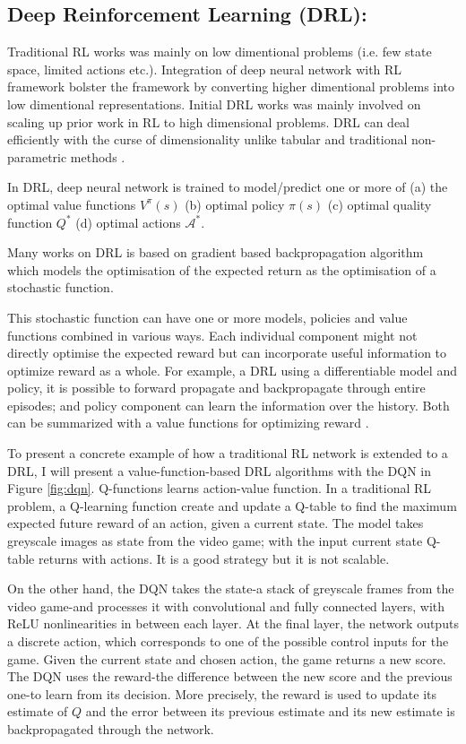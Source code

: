 \subsection{Deep Reinforcement Learning (DRL):}
Traditional RL works was mainly on low dimentional problems (i.e. few state space, limited actions etc.). Integration of deep neural network with RL framework bolster the framework by converting higher dimentional problems into low dimentional representations. Initial DRL works was mainly involved on scaling up prior work in RL to high dimensional problems.
DRL can deal
efficiently with the curse of dimensionality unlike tabular and
traditional non-parametric methods \cite{bengio2013representation}.

In DRL, deep neural network is trained to model/predict one or more of (a) the optimal value functions $V^\pi(s)$ (b) optimal policy $\pi(s)$
(c) optimal quality function $Q^*$ (d) optimal actions $\mathcal{A}^*$.

Many works on DRL is based on gradient based backpropagation algorithm \cite{heess2015learning, schulman2015gradient, rumelhart1985learning} which models the optimisation
of the expected return as the optimisation of a
stochastic function.

This stochastic function can have one or more
models, policies and value functions combined in various ways.
Each individual component might not directly optimise the expected reward but can incorporate useful information to optimize reward as a whole.
For example, a DRL using a differentiable model and policy,
it is possible to forward propagate and backpropagate through
entire episodes; and policy component can learn the information over the history. Both can be summarized with a value functions for optimizing reward \cite{heess2015learning}.

To present a concrete example of how a traditional RL network is extended to a DRL, I will present a value-function-based DRL algorithms
with the DQN in Figure \ref{fig:dqn}.
Q-functions learns action-value function. In a traditional RL problem, a Q-learning function create and update a Q-table to find the maximum expected future reward of an action, given a current state. The model takes greyscale images as state from the video game; with the input current state Q-table returns with actions. It is a good strategy but it is not scalable.

On the other hand, the DQN takes the state-a stack of greyscale frames from the video game-and processes it with convolutional and
fully connected layers, with ReLU nonlinearities in between each layer. At the final layer, the network outputs a discrete action, which corresponds to one of the possible control inputs for the game.  Given the current state and chosen action, the game returns a new score.
The DQN uses the reward-the difference
between the new score and the previous one-to learn from its decision. More precisely, the reward is used to update its estimate of $Q$ and the error between its previous estimate and its new estimate is backpropagated through the network.

